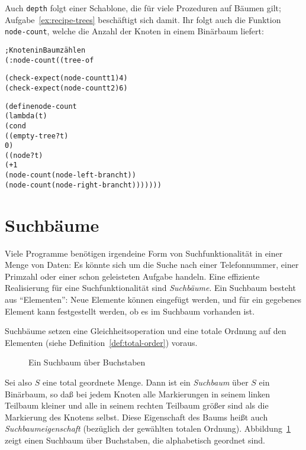 Auch \texttt{depth} folgt einer 
Schablone, die für viele Prozeduren auf Bäumen
gilt; Aufgabe~\ref{ex:recipe-trees} beschäftigt sich damit.
Ihr folgt auch die Funktion \texttt{node-count}, welche die Anzahl der
Knoten in einem Binärbaum liefert:
%
\begin{alltt}
; Knoten in Baum zählen
(: node-count ((tree-of %a) -> natural))

(check-expect (node-count t1) 4)
(check-expect (node-count t2) 6)

(define node-count
  (lambda (t)
    (cond
      ((empty-tree? t)
       0)
      ((node? t)
       (+ 1
          (node-count (node-left-branch t))
          (node-count (node-right-branch t)))))))
\end{alltt}
%

\section{Suchbäume}
\label{sec:search-trees}

Viele Programme benötigen irgendeine Form von Suchfunktionalität in
einer Menge von Daten: Es könnte sich um die Suche nach einer
Telefonnummer, einer Primzahl oder einer schon geleisteten Aufgabe
handeln.  Eine effiziente Realisierung für eine Suchfunktionalität
sind \textit{Suchbäume}.  Ein Suchbaum besteht aus
"`Elementen"': Neue Elemente können eingefügt werden, und für ein
gegebenes Element kann festgestellt werden, ob es im Suchbaum
vorhanden ist.

Suchbäume setzen eine Gleichheitsoperation und eine totale Ordnung auf
den Elementen (siehe Definition~\ref{def:total-order}) voraus.

\begin{figure}[tb]
\begin{pspdf}
\begin{center}
   {
     {  }
     {   } }
\end{center}
\end{pspdf}
  \caption{Ein Suchbaum über Buchstaben}
  \label{fig:searchtree}
\end{figure}

 Sei also $S$ eine total geordnete
Menge.  Dann ist ein \textit{Suchbaum} über $S$ ein Binärbaum, so daß bei
jedem Knoten alle Markierungen in seinem linken Teilbaum kleiner und
alle in seinem rechten Teilbaum größer sind als die Markierung des Knotens
selbst.  Diese Eigenschaft des Baums heißt auch
\textit{Suchbaumeigenschaft} (bezüglich der gewählten totalen
Ordnung).
Abbildung~\ref{fig:searchtree} zeigt einen Suchbaum über Buchstaben,
die alphabetisch geordnet sind.

